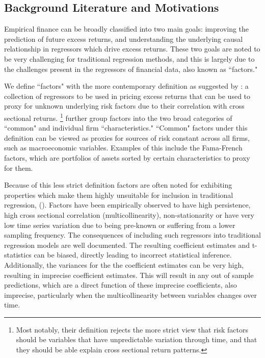 \documentclass[11pt, a4paper, table]{article}
\begin{document}
\subsection{Background Literature and Motivations}

Empirical finance can be broadly classified into two main goals: improving the prediction of future excess returns, and understanding the underlying causal relationship in regressors which drive excess returns. These two goals are noted to be very challenging for traditional regression methods, and this is largely due to the challenges present in the regressors of financial data, also known as ``factors." 

We define ``factors" with the more contemporary definition as suggested by \cite{harvey__2016}: a collection of regressors to be used in pricing excess returns that can be used to proxy for unknown underlying risk factors due to their correlation with cross sectional returns. \footnote{Most notably, their definition rejects the more strict view that risk factors should be variables that have unpredictable variation through time, and that they should be able explain cross sectional return patterns.} \cite{harvey__2016} further group factors into the two broad categories of ``common" and individual firm ``characteristics." ``Common" factors under this definition can be viewed as proxies for sources of risk constant across all firms, such as macroeconomic variables. Examples of this include the Fama-French factors, which are portfolios of assets sorted by certain characteristics to proxy for them. 

Because of this less strict definition factors are often noted for exhibiting properties which make them highly unsuitable for inclusion in traditional regression, (\cite{harvey__2016}). Factors have been empirically observed to have high persistence, high cross sectional correlation (multicollinearity), non-stationarity or have very low time series variation due to being pre-known or suffering from a lower sampling frequency. The consequences of including such regressors into traditional regression models are well documented. The resulting coefficient estimates and t-statistics can be biased, directly leading to incorrect statistical inference. Additionally, the variances for the the coefficient estimates can be very high, resulting in imprecise coefficient estimates. This will result in any out of sample predictions, which are a direct function of these imprecise coefficients, also imprecise, particularly when the multicollinearity between variables changes over time.
\end{document}

